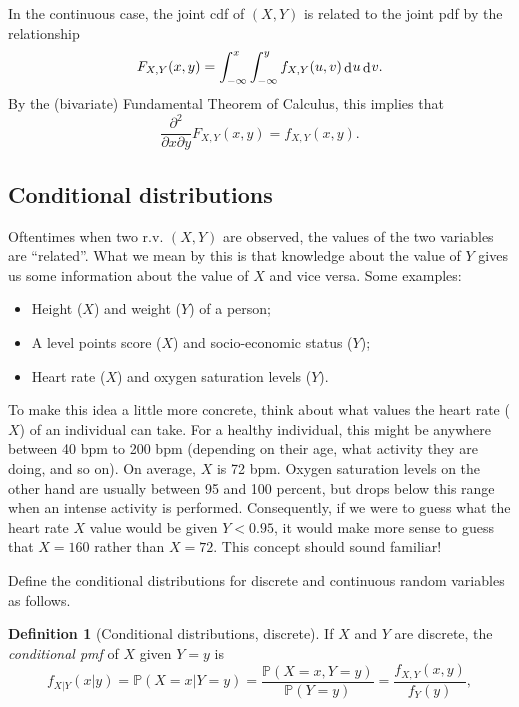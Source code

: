 \documentclass[
]{book}
\providecommand{\tightlist}{%
  \setlength{\itemsep}{0pt}\setlength{\parskip}{0pt}}
\newcommand{\bbP}{\mathbb{P}}
\DeclareMathOperator{\dd}{d}
\newcommand{\dint}{\dd\hspace{0.5pt}\!}
\theoremstyle{definition}
\newtheorem{definition}{Definition}[chapter]
\theoremstyle{definition}
\theoremstyle{definition}
\theoremstyle{definition}
\theoremstyle{remark}
\begin{document}
In the continuous case, the joint cdf of \((X,Y)\) is related to the joint pdf by the relationship
\[
F_{X,Y}(x,y) = \int_{-\infty}^x \int_{-\infty}^y f_{X,Y}(u,v) \dint u \dint v.
\]
By the (bivariate) Fundamental Theorem of Calculus, this implies that
\[
\frac{\partial^2}{\partial x \partial y}F_{X,Y}(x,y) = f_{X,Y}(x,y).
\]

\hypertarget{conditional-distributions}{%
\subsection{Conditional distributions}\label{conditional-distributions}}

Oftentimes when two r.v. \((X,Y)\) are observed, the values of the two variables are ``related''.
What we mean by this is that knowledge about the value of \(Y\) gives us some information about the value of \(X\) and vice versa.
Some examples:

\begin{itemize}
\tightlist
\item
  Height (\(X\)) and weight (\(Y\)) of a person;
\item
  A level points score (\(X\)) and socio-economic status (\(Y\));
\item
  Heart rate (\(X\)) and oxygen saturation levels (\(Y\)).
\end{itemize}

To make this idea a little more concrete, think about what values the heart rate (\(X\)) of an individual can take.
For a healthy individual, this might be anywhere between 40 bpm to 200 bpm (depending on their age, what activity they are doing, and so on).
On average, \(X\) is 72 bpm.
Oxygen saturation levels on the other hand are usually between 95 and 100 percent, but drops below this range when an intense activity is performed.
Consequently, if we were to guess what the heart rate \(X\) value would be given \(Y<0.95\), it would make more sense to guess that \(X=160\) rather than \(X=72\).
This concept should sound familiar!

Define the conditional distributions for discrete and continuous random variables as follows.

\begin{definition}[Conditional distributions, discrete]
If \(X\) and \(Y\) are discrete, the \emph{conditional pmf} of \(X\) given \(Y=y\) is
\[
  f_{X|Y}(x|y) = \bbP(X=x|Y=y) = \frac{\bbP(X=x, Y=y)}{\bbP(Y=y)} = \frac{f_{X,Y}(x, y)}{f_Y(y)},
\]
\end{definition}
\end{document}
